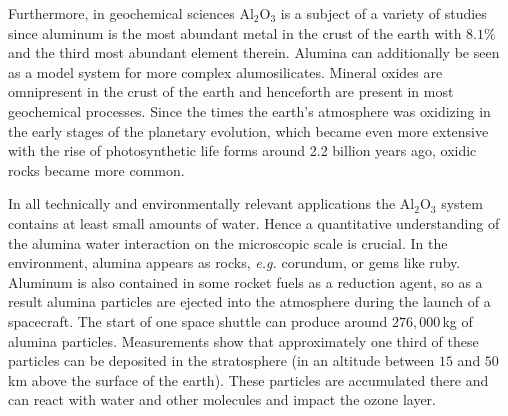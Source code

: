 \documentclass[11pt,DIV=13,BCOR=5mm,a4paper,headinclude]{scrbook}
\begin{document}
Furthermore, in geochemical sciences Al$_2$O$_3$ is a subject of a variety of studies since aluminum is the most abundant metal in the crust of the earth with  $8.1\%$ %
and the third most abundant element therein\cite{dtv-Atlas,Riedel}.
Alumina can additionally be seen as a model system for more complex alumosilicates.
Mineral oxides are omnipresent in the crust of the earth and henceforth are present in most geochemical processes.
Since the times the earth's atmosphere was oxidizing in the early stages of the planetary evolution\cite{Trail2011}, which became even more extensive with the rise of photosynthetic life forms\cite{Frei2009,Buick2008,Olson2006} around 2.2 billion years ago\cite{Kirschvink2008}, oxidic rocks became more common.


In all technically and environmentally relevant applications the Al$_2$O$_3$ system contains at least small amounts of water.
Hence a quantitative understanding of the alumina water interaction on the microscopic scale is crucial.
In the environment, alumina appears as rocks, \textit{e.g.} corundum, or gems like ruby.
Aluminum is also contained in some rocket fuels as a reduction agent, so as a result alumina particles are ejected into the atmosphere during the launch of a spacecraft\cite{Elam1998}.
The start of one space shuttle can produce around $276,000\,$kg of alumina particles\cite{Potter1978}.
Measurements show that approximately one third of these particles can be deposited in the stratosphere\cite{Cofer1978} (in an altitude between $15$ and $50\,$km above the surface of the earth).
These particles are accumulated there and can react with water and other molecules\cite{Jones1995,Jackman1996} and impact the ozone layer.
\end{document}
